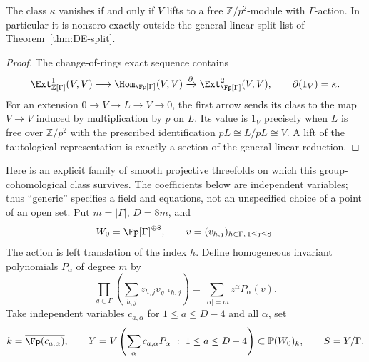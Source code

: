 \begin{lemma}\label{lem:DE-kappa}
The class $\kappa$ vanishes if and only if $V$ lifts to a free $\mathbb Z/p^2$-module with $\Gamma$-action.  In particular it is nonzero exactly outside the general-linear split list of Theorem~\ref{thm:DE-split}.
\end{lemma}
\begin{proof}
The change-of-rings exact sequence contains
\[
 \Ext^1_{\mathbb Z[\Gamma]}(V,V)\longrightarrow
 \Hom_{\Fp[\Gamma]}(V,V)\xrightarrow{\partial}
 \Ext^2_{\Fp[\Gamma]}(V,V),
 \qquad\partial(1_V)=\kappa.
\]
For an extension $0\to V\to L\to V\to0$, the first arrow sends its class to the map $V\to V$ induced by multiplication by $p$ on $L$.  Its value is $1_V$ precisely when $L$ is free over $\mathbb Z/p^2$ with the prescribed identification $pL\cong L/pL\cong V$.  A lift of the tautological representation is exactly a section of the general-linear reduction.
\end{proof}

Here is an explicit family of smooth projective threefolds on which this group-cohomological class survives.  The coefficients below are independent variables; thus ``generic'' specifies a field and equations, not an unspecified choice of a point of an open set.  Put $m=|\Gamma|$, $D=8m$, and
\[
 W_0=\Fp[\Gamma]^{\oplus8},\qquad
 v=(v_{h,j})_{h\in\Gamma,\,1\leq j\leq8}.
\]
The action is left translation of the index $h$.  Define homogeneous invariant polynomials $P_\alpha$ of degree $m$ by
\[
 \prod_{g\in\Gamma}\left(\sum_{h,j}z_{h,j}v_{g^{-1}h,j}\right)
    =\sum_{|\alpha|=m}z^\alpha P_\alpha(v).
\]
Take independent variables $c_{a,\alpha}$ for $1\leq a\leq D-4$ and all $\alpha$, set
\[
 k=\overline{\Fp(c_{a,\alpha})},\qquad
 Y=V\left(\sum_\alpha c_{a,\alpha}P_\alpha\ :\ 1\leq a\leq D-4\right)
      \subset\mathbb P(W_0)_k,\qquad S=Y/\Gamma.
\]

